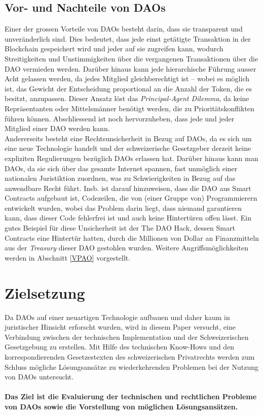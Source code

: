 \documentclass[a4paper,12pt]{report}
\begin{document}
        \subsection{Vor- und Nachteile von DAOs}
        \startsubsection
            Einer der grossen Vorteile von DAOs besteht darin, dass sie transparent und unveränderlich sind. Dies bedeutet, dass jede einst getätigte Transaktion in der Blockchain gespeichert wird und jeder auf sie zugreifen kann, wodurch Streitigkeiten und Unstimmigkeiten über die vergangenen Transaktionen über die DAO vermieden werden. Darüber hinaus kann jede hierarchische Führung ausser Acht gelassen werden, da jedes Mitglied gleichberechtigt ist – wobei es möglich ist, das Gewicht der Entscheidung proportional an die Anzahl der Token, die es besitzt, anzupassen. Dieser Ansatz löst das \textit{Principal-Agent Dilemma}, da keine Repräsentanten oder Mittelsmänner benötigt werden, die zu Prioritätskonflikten führen können. Abschliessend ist noch hervorzuheben, dass jede und jeder Mitglied einer DAO werden kann. \\
            Andererseits besteht eine Rechtsunsicherheit in Bezug auf DAOs, da es sich um eine neue Technologie handelt und der schweizerische Gesetzgeber derzeit keine expliziten Regulierungen bezüglich DAOs erlassen hat. Darüber hinaus kann man DAOs, da sie sich über das gesamte Internet spannen, fast unmöglich einer nationalen Juristiktion zuordnen, was zu Schwierigkeiten in Bezug auf das anwendbare Recht führt. Insb. ist darauf hinzuweisen, dass die DAO aus Smart Contracts aufgebaut ist, Codezeilen, die von (einer Gruppe von) Programmierern entwickelt wurden, wobei das Problem darin liegt, dass niemand garantieren kann, dass dieser Code fehlerfrei ist und auch keine Hintertüren offen lässt. Ein gutes Beispiel für diese Unsicherheit ist der The DAO Hack, dessen Smart Contracts eine Hintertür hatten, durch die Millionen von Dollar an Finanzmitteln aus der \textit{Treasury} dieser DAO gestohlen wurden. Weitere Angriffsmöglichkeiten werden in Abschnitt \ref{VPAO} vorgestellt.
        \closesection
    \closesection
    \newpage
	\section{Zielsetzung}
	\startsection
	    Da DAOs auf einer neuartigen Technologie aufbauen und daher kaum in juristischer Hinsicht erforscht wurden, wird in diesem Paper versucht, eine Verbindung zwischen der technischen Implementation und der Schweizerischen Gesetzgebung zu erstellen. Mit Hilfe des technischen Know-Hows und den korrespondierenden Gesetzestexten des schweizerischen Privatrechts werden zum Schluss mögliche Lösungsansätze zu wiederkehrenden Problemen bei der Nutzung von DAOs untersucht. \\ \\
	    \textbf{Das Ziel ist die Evaluierung der technischen und rechtlichen Probleme von DAOs sowie die Vorstellung von möglichen Lösungsansätzen.}
	\closesection
	
\end{document}
